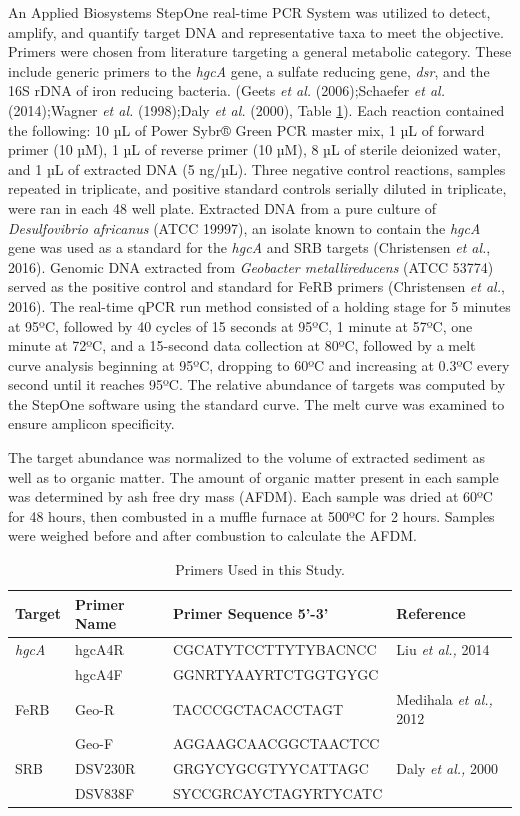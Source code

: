 \documentclass[ms, hidelinks]{uncgdissertationexp3}
\theoremstyle{plain}
\theoremstyle{definition}
\theoremstyle{remark}
\newcommand{\titlecaption}[2]{\caption[#1]{#1. #2}}
\begin{document}
An Applied Biosystems StepOne real-time PCR System was utilized to detect, amplify, and quantify target DNA and representative taxa to meet the objective. Primers were chosen from literature targeting a general metabolic category. These include generic primers to the \emph{hgcA} gene, a sulfate reducing gene, \emph{dsr}, and the 16S rDNA of iron reducing bacteria. (Geets \emph{et al.} (2006);Schaefer \emph{et al.} (2014);Wagner \emph{et al.} (1998);Daly \emph{et al.} (2000), Table \ref{tab:primers}). Each reaction contained the following: 10 µL of Power Sybr® Green PCR master mix, 1 µL of forward primer (10 µM), 1 µL of reverse primer (10 µM), 8 µL of sterile deionized water, and 1 µL of extracted DNA (5 ng/µL). Three negative control reactions, samples repeated in triplicate, and positive standard controls serially diluted in triplicate, were ran in each 48 well plate. Extracted DNA from a pure culture of \emph{Desulfovibrio africanus} (ATCC 19997), an isolate known to contain the \emph{hgcA} gene was used as a standard for the \emph{hgcA} and SRB targets (Christensen \emph{et al.}, 2016). Genomic DNA extracted from \emph{Geobacter metallireducens} (ATCC 53774) served as the positive control and standard for FeRB primers (Christensen \emph{et al.}, 2016). The real-time qPCR run method consisted of a holding stage for 5 minutes at 95ºC, followed by 40 cycles of 15 seconds at 95ºC, 1 minute at 57ºC, one minute at 72ºC, and a 15-second data collection at 80ºC, followed by a melt curve analysis beginning at 95ºC, dropping to 60ºC and increasing at 0.3ºC every second until it reaches 95ºC. The relative abundance of targets was computed by the StepOne software using the standard curve. The melt curve was examined to ensure amplicon specificity.

The target abundance was normalized to the volume of extracted sediment as well as to organic matter. The amount of organic matter present in each sample was determined by ash free dry mass (AFDM). Each sample was dried at 60ºC for 48 hours, then combusted in a muffle furnace at 500ºC for 2 hours. Samples were weighed before and after combustion to calculate the AFDM.

\begin{table}[htbp]
  \titlecaption{ Primers Used in this Study}{}\label{tab:primers}
  \centering
  \begin{tabular}{llll}
  \toprule
  Target & Primer Name & Primer Sequence 5’-3’ & Reference\\
  \midrule
  \em{hgcA} & hgcA4R & CGCATYTCCTTYTYBACNCC & Liu \emph{et al.,} 2014\\
   & hgcA4F & GGNRTYAAYRTCTGGTGYGC & \\
  FeRB & Geo-R & TACCCGCTACACCTAGT & Medihala \emph{et al.,} 2012\\
   & Geo-F & AGGAAGCAACGGCTAACTCC & \\
  SRB & DSV230R & GRGYCYGCGTYYCATTAGC & Daly \emph{et al.,} 2000\\
   & DSV838F & SYCCGRCAYCTAGYRTYCATC & \\
  \bottomrule
  \end{tabular}
\end{table}
\end{document}
